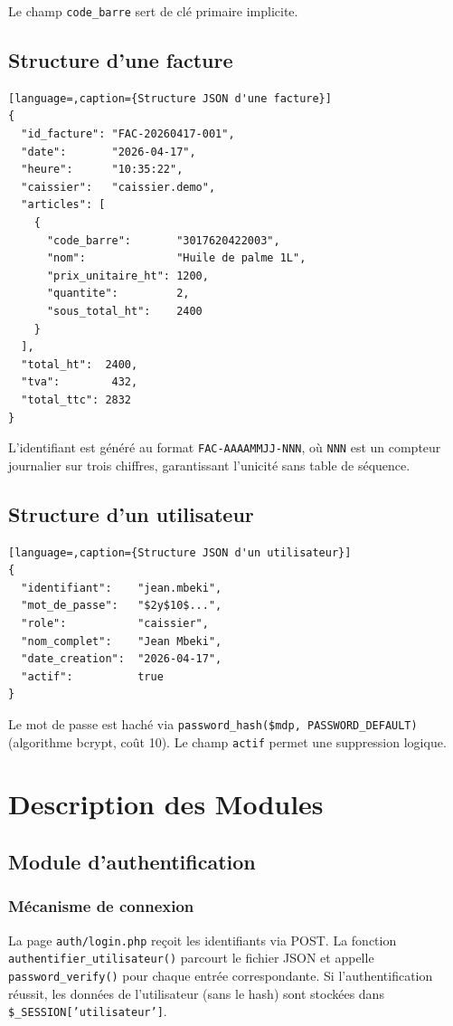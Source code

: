 \documentclass[12pt,a4paper]{report}
\begin{document}
Le champ \texttt{code\_barre} sert de clé primaire implicite.

\section{Structure d'une facture}

\begin{lstlisting}[language=,caption={Structure JSON d'une facture}]
{
  "id_facture": "FAC-20260417-001",
  "date":       "2026-04-17",
  "heure":      "10:35:22",
  "caissier":   "caissier.demo",
  "articles": [
    {
      "code_barre":       "3017620422003",
      "nom":              "Huile de palme 1L",
      "prix_unitaire_ht": 1200,
      "quantite":         2,
      "sous_total_ht":    2400
    }
  ],
  "total_ht":  2400,
  "tva":        432,
  "total_ttc": 2832
}
\end{lstlisting}

L'identifiant est généré au format \texttt{FAC-AAAAMMJJ-NNN}, où \texttt{NNN}
est un compteur journalier sur trois chiffres, garantissant l'unicité sans table de séquence.

\section{Structure d'un utilisateur}

\begin{lstlisting}[language=,caption={Structure JSON d'un utilisateur}]
{
  "identifiant":    "jean.mbeki",
  "mot_de_passe":   "$2y$10$...",
  "role":           "caissier",
  "nom_complet":    "Jean Mbeki",
  "date_creation":  "2026-04-17",
  "actif":          true
}
\end{lstlisting}

Le mot de passe est haché via \texttt{password\_hash(\$mdp, PASSWORD\_DEFAULT)}
(algorithme bcrypt, coût 10). Le champ \texttt{actif} permet une suppression logique.

\chapter{Description des Modules}

\section{Module d'authentification}

\subsection{Mécanisme de connexion}
La page \texttt{auth/login.php} reçoit les identifiants via POST. La fonction
\texttt{authentifier\_utilisateur()} parcourt le fichier JSON et appelle
\texttt{password\_verify()} pour chaque entrée correspondante. Si l'authentification
réussit, les données de l'utilisateur (sans le hash) sont stockées dans
\texttt{\$\_SESSION['utilisateur']}.
\end{document}
